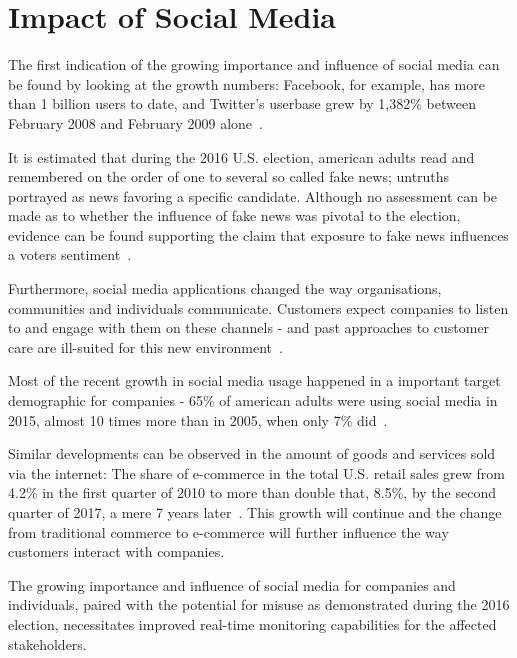 \section{Impact of Social Media}
\label{sec:developmentOfSocialMedia}

The first indication of the growing importance and influence of social media can be found by looking at the growth numbers:
Facebook, for example, has more than 1 billion users to date, and Twitter's userbase grew by 1,382\% between February 2008 and February 2009 alone~\cite{mcgiboney2009twitter}.
\par

It is estimated that during the 2016 U.S. election, american adults read and remembered on the order of one to several so called fake news;
untruths portrayed as news favoring a specific candidate.
Although no assessment can be made as to whether the influence of fake news was pivotal to the election,
evidence can be found supporting the claim that exposure to fake news influences a voters sentiment~\cite{Allcott2017}.
\par
Furthermore, social media applications changed the way organisations, communities and individuals communicate.
Customers expect companies to listen to and engage with them on these channels - and past approaches to customer care are ill-suited for this new environment~\cite{Kietzmann2011}.
\par
Most of the recent growth in social media usage happened in a important target demographic for companies -
65\% of american adults were using social media in 2015, almost 10 times more than in 2005, when only 7\% did~\cite{Perrin2015}.
\par
Similar developments can be observed in the amount of goods and services sold via the internet:
The share of e-commerce in the total U.S. retail sales grew from 4.2\% in the first quarter of 2010 to more than double that, 8.5\%,
by the second quarter of 2017, a mere 7 years later~\cite{statistaECommerceGrowth}.
This growth will continue and the change from traditional commerce to e-commerce
will further influence the way customers interact with companies.
\par
The growing importance and influence of social media for companies and individuals,
paired with the potential for misuse as demonstrated during the 2016 election,
necessitates improved real-time monitoring capabilities for the affected stakeholders.
\par
